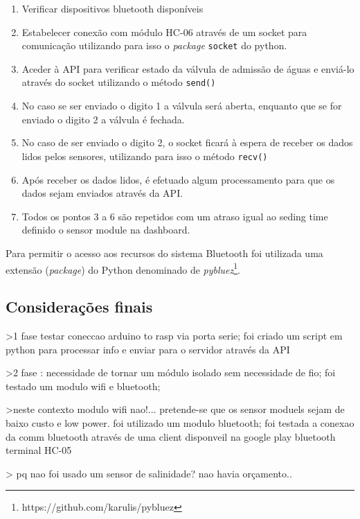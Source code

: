 \begin{enumerate}
	\item Verificar dispositivos bluetooth disponíveis
	\item Estabelecer conexão com módulo HC-06 através de um socket para comunicação utilizando para isso o \textit{package} \texttt{socket} do python. 
	\item Aceder à API para verificar estado da válvula de admissão de águas e enviá-lo através do socket utilizando o método \texttt{send()} 
	\item No caso se ser enviado o digito 1 a válvula será aberta, enquanto que se for enviado o digito 2 a válvula é fechada. 
	\item No caso de ser enviado o digito 2, o socket ficará à espera de receber os dados lidos pelos sensores, utilizando para isso o método \texttt{recv()}
	\item Após receber os dados lidos, é efetuado algum processamento para que os dados sejam enviados através da API. 
	\item Todos os pontos 3 a 6 são repetidos com um atraso igual ao seding time definido o sensor module na dashboard. 
	
\end{enumerate}

Para permitir o acesso aos recursos do sistema Bluetooth foi utilizada uma extensão (\textit{package}) do Python denominado de \textit{pybluez}\footnote{https://github.com/karulis/pybluez}. 




\subsection{Considerações finais}


>1 fase testar coneccao arduino to rasp via porta serie; foi criado um script em python para processar info e enviar para o servidor através da API 

>2 fase : necessidade de tornar um módulo isolado sem necessidade de fio; foi testado um modulo wifi e bluetooth; 

>neste contexto modulo wifi nao!... pretende-se que os sensor moduels sejam de baixo custo e low power. foi utilizado um modulo bluetooth; foi testada a conexao da comm bluetooth através de uma client disponveil na google play bluetooth terminal HC-05 


> 
pq nao foi usado um sensor de salinidade? nao havia orçamento.. 









